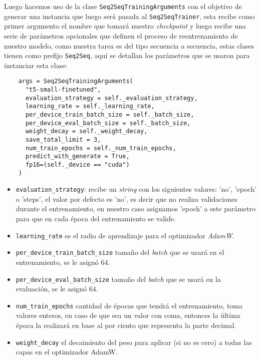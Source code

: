 Luego hacemos uso de la clase \texttt{Seq2SeqTrainingArguments}  con el objetivo de generar una instancia que luego será pasada al \texttt{Seq2SeqTrainer}, esta recibe como primer argumento el nombre que tomará nuestro \textit{checkpoint} y luego recibe una serie de parámetros opcionales que definen el proceso de reentrenamiento de nuestro modelo, como nuestra tarea es del tipo secuencia a secuencia, estas clases tienen como prefijo \texttt{Seq2Seq}, aquí se detallan los parámetros que se usaron para instanciar esta clase:

\begin{verbatim}
    args = Seq2SeqTrainingArguments(
      "t5-small-finetuned",
      evaluation_strategy = self._evaluation_strategy,
      learning_rate = self._learning_rate,
      per_device_train_batch_size = self._batch_size,
      per_device_eval_batch_size = self._batch_size,
      weight_decay = self._weight_decay,
      save_total_limit = 3,
      num_train_epochs = self._num_train_epochs,
      predict_with_generate = True,
      fp16=(self._device == "cuda")
    )
\end{verbatim}

\begin{itemize}
    \item \texttt{evaluation\_strategy}: recibe un \textit{string} con los siguientes valores: 'no', 'epoch' o 'steps', el valor por defecto es 'no', es decir que no realiza validaciones durante el entrenamiento, en nuestro caso asignamos 'epoch' a este parámetro para que en cada época del entrenamiento se valide.
    \item \texttt{learning\_rate} es el radio de aprendizaje para el optimizador \textit{AdamW}.
    \item \texttt{per\_device\_train\_batch\_size} tamaño del \textit{batch} que se usará en el entrenamiento, se le asignó 64.
    \item \texttt{per\_device\_eval\_batch\_size} tamaño del \textit{batch} que se usará en la evaluación, se le asignó 64.
    \item \texttt{num\_train\_epochs} cantidad de épocas que tendrá el entrenamiento, toma valores enteros, en caso de que sea un valor con coma, entonces la última época la realizará en base al por ciento que representa la parte decimal.
    \item \texttt{weight\_decay} el decaimiento del peso para aplicar (si no es cero) a todas las capas en el optimizador AdamW.
\end{itemize}

